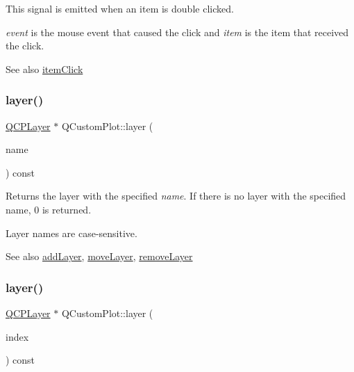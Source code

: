 This signal is emitted when an item is double clicked.

{\itshape event} is the mouse event that caused the click and {\itshape item} is the item that received the click.

\begin{DoxySeeAlso}{See also}
\mbox{\hyperlink{class_q_custom_plot_ae16b51f52d2b7aebbc7e3e74e6ff2e4b}{item\+Click}} 
\end{DoxySeeAlso}
\mbox{\label{class_q_custom_plot_a0a96244e7773b242ef23c32b7bdfb159}} 
\subsubsection{\texorpdfstring{layer()}{layer()}\hspace{0.1cm}{\footnotesize\ttfamily [1/2]}}
{\footnotesize\ttfamily \mbox{\hyperlink{class_q_c_p_layer}{Q\+C\+P\+Layer}} $\ast$ Q\+Custom\+Plot\+::layer (\begin{DoxyParamCaption}\item[{const Q\+String \&}]{name }\end{DoxyParamCaption}) const}

Returns the layer with the specified {\itshape name}. If there is no layer with the specified name, 0 is returned.

Layer names are case-\/sensitive.

\begin{DoxySeeAlso}{See also}
\mbox{\hyperlink{class_q_custom_plot_ad5255393df078448bb6ac83fa5db5f52}{add\+Layer}}, \mbox{\hyperlink{class_q_custom_plot_ae896140beff19424e9e9e02d6e331104}{move\+Layer}}, \mbox{\hyperlink{class_q_custom_plot_a40f75e342c5eaab6a86066a42a0e2a94}{remove\+Layer}} 
\end{DoxySeeAlso}
\mbox{\label{class_q_custom_plot_acbb570f4c24306e7c2324d40bfe157c2}} 
\subsubsection{\texorpdfstring{layer()}{layer()}\hspace{0.1cm}{\footnotesize\ttfamily [2/2]}}
{\footnotesize\ttfamily \mbox{\hyperlink{class_q_c_p_layer}{Q\+C\+P\+Layer}} $\ast$ Q\+Custom\+Plot\+::layer (\begin{DoxyParamCaption}\item[{int}]{index }\end{DoxyParamCaption}) const}

